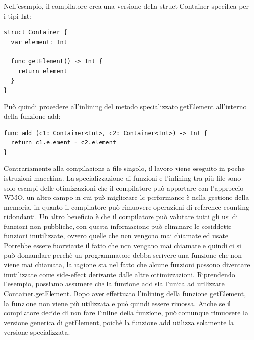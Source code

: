 Nell'esempio, il compilatore crea una versione della struct Container specifica per i tipi Int: 
\begin{lstlisting}
struct Container {
  var element: Int

  func getElement() -> Int {
    return element
  }
}
\end{lstlisting}
Può quindi procedere all'inlining del metodo specializzato getElement all'interno della funzione add:
\begin{lstlisting}
func add (c1: Container<Int>, c2: Container<Int>) -> Int {
  return c1.element + c2.element
}
\end{lstlisting}
Contrariamente alla compilazione a file singolo, il lavoro viene eseguito in poche istruzioni macchina. La specializzazione di funzioni e l'inlining tra più file sono solo esempi delle otimizzazioni che il compilatore può apportare con l'approccio WMO, un altro campo in cui può migliorare le performance è nella gestione della memoria, in quanto il compilatore può rimuovere operazioni di reference counting ridondanti. Un altro beneficio è che il compilatore può valutare tutti gli usi di funzioni non pubbliche, con questa informazione può eliminare le cosiddette funzioni inutilizzate, ovvero quelle che non vengono mai chiamate ed usate. Potrebbe essere fuorviante il fatto che non vengano mai chiamate e quindi ci si può domandare perchè un programmatore debba scrivere una funzione che non viene mai chiamata, la ragione sta nel fatto che alcune funzioni possono diventare inutilizzate come side-effect derivante dalle altre ottimizzazioni. Riprendendo l'esempio, possiamo assumere che  la funzione add sia l'unica ad utilizzare Container.getElement. Dopo aver effettuato l'inlining della funzione getElement, la funzione non viene più utilizzata e può quindi essere rimossa. Anche se il compilatore decide di non fare l'inline della funzione, può comunque rimuovere la versione generica di getElement, poichè la funzione add utilizza solamente la versione specializzata.
